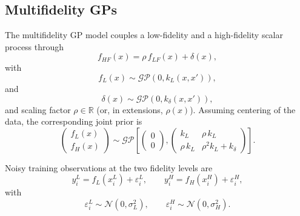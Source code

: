 \documentclass[11pt,a4paper]{article}
\begin{document}
\subsection{Multifidelity GPs}

The multifidelity GP model couples a low-fidelity and a
high-fidelity scalar process through
\[
    f_{HF}(x)
    =
    \rho\, f_{LF}(x) + \delta(x),
\]
with
\[
    f_{L}(x) \sim \mathcal{GP}\left(0, k_{L}(x,x')\right),
\]
and
\[
    \delta(x) \sim \mathcal{GP}\left(0, k_{\delta}(x,x')\right),
\]
and scaling factor \(\rho \in \mathbb{R}\) (or, in extensions,
\(\rho(x)\)).
Assuming centering of the data, the corresponding joint prior is
\[
    \begin{pmatrix}
        f_{L}(x) \\
        f_{H}(x)
    \end{pmatrix}
    \sim
    \mathcal{GP}
    \left[
    \begin{pmatrix}
        0 \\
        0
    \end{pmatrix},
    \begin{pmatrix}
        k_{L} & \rho\, k_{L} \\
        \rho\, k_{L} & \rho^{2} k_{L} + k_{\delta}
    \end{pmatrix}
    \right].
\]



Noisy training observations at the two fidelity levels are
\[
    y_{i}^{L}
    =
    f_{L}(x_{i}^{L}) + \varepsilon_{i}^{L},
    \qquad
    y_{i}^{H}
    =
    f_{H}(x_{i}^{H}) + \varepsilon_{i}^{H},
\]
with
\[
    \varepsilon_{i}^{L} \sim \mathcal{N}\left(0, \sigma_{L}^{2}\right),
    \qquad
    \varepsilon_{i}^{H} \sim \mathcal{N}\left(0, \sigma_{H}^{2}\right).
\]
\end{document}
